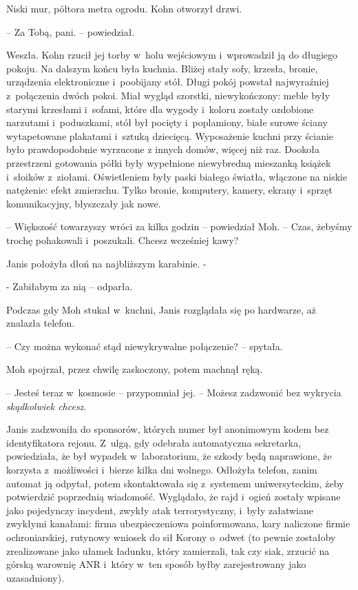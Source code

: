 \documentclass[oneside,polish,11pt,sfheadings]{mwbk}
\begin{document}
Niski mur, półtora metra ogrodu. Kohn otworzył drzwi.

-- Za Tobą, pani. -- powiedział.

Weszła. Kohn rzucił jej torby w~holu wejściowym i~wprowadził ją do
długiego pokoju. Na dalszym końcu była kuchnia. Bliżej stały sofy,
krzesła, bronie, urządzenia elektroniczne i~poobijany stół. Długi pokój
powstał najwyraźniej z~połączenia dwóch pokoi. Miał wygląd szorstki,
niewykończony: meble były starymi krzesłami i~sofami, które dla wygody i~koloru zostały ozdobione narzutami i~poduszkami, stół był pocięty i~poplamiony, białe surowe ściany wytapetowane plakatami i~sztuką
dziecięcą. Wyposażenie kuchni przy ścianie było prawdopodobnie wyrzucone
z innych domów, więcej niż raz. Dookoła przestrzeni gotowania półki były
wypełnione niewybredną mieszanką książek i~słoików z~ziołami.
Oświetleniem były paski białego światła, włączone na niskie natężenie:
efekt zmierzchu. Tylko bronie, komputery, kamery, ekrany i~sprzęt
komunikacyjny, błyszczały jak nowe.

-- Większość towarzyszy wróci za kilka godzin -- powiedział Moh. -- Czas,
żebyśmy trochę pohakowali i~poszukali. Chcesz wcześniej kawy?

Janis położyła dłoń na najbliższym karabinie. -

- Zabiłabym za nią -- odparła.

Podczas gdy Moh stukał w~kuchni, Janis rozglądała się po hardwarze, aż
znalazła telefon.

-- Czy można wykonać stąd niewykrywalne połączenie? -- spytała.

Moh spojrzał, przez chwilę zaskoczony, potem machnął ręką.

-- Jesteś teraz w~kosmosie -- przypomniał jej. -- Możesz zadzwonić bez
wykrycia \emph{skądkolwiek chcesz}.

Janis zadzwoniła do sponsorów, których numer był anonimowym kodem bez
identyfikatora rejonu. Z~ulgą, gdy odebrała automatyczna sekretarka,
powiedziała, że był wypadek w~laboratorium, że szkody będą naprawione,
że korzysta z~możliwości i~bierze kilka dni wolnego. Odłożyła telefon,
zanim automat ją odpytał, potem skontaktowała się z~systemem
uniwersyteckim, żeby potwierdzić poprzednią wiadomość. Wyglądało, że
rajd i~ogień zostały wpisane jako pojedynczy incydent, zwykły atak
terrorystyczny, i~były załatwiane zwykłymi kanałami: firma
ubezpieczeniowa poinformowana, kary naliczone firmie ochroniarskiej,
rutynowy wniosek do sił Korony o~odwet (to pewnie zostałoby zrealizowane
jako ułamek ładunku, który zamierzali, tak czy siak, zrzucić na górską
warownię ANR i~który w~ten sposób byłby zarejestrowany jako
uzasadniony).
\end{document}
